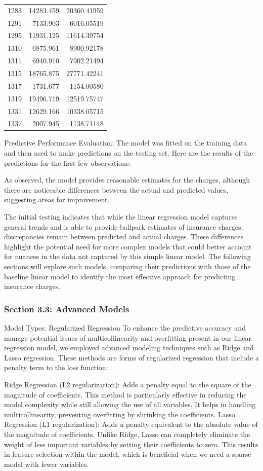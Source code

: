\documentclass[
  12pt,
]{article}
\begin{document}
\begin{longtable}[]{@{}lrr@{}}
1283 & 14283.459 & 20360.41959 \\
1291 & 7133.903 & 6016.05519 \\
1295 & 11931.125 & 11614.39754 \\
1310 & 6875.961 & 8900.92178 \\
1311 & 6940.910 & 7902.21494 \\
1315 & 18765.875 & 27771.42241 \\
1317 & 1731.677 & -1154.00580 \\
1319 & 19496.719 & 12519.75747 \\
1331 & 12629.166 & 10338.05715 \\
1337 & 2007.945 & 1138.71148 \\
\end{longtable}

Predictive Performance Evaluation: The model was fitted on the training
data and then used to make predictions on the testing set. Here are the
results of the predictions for the first few observations:

As observed, the model provides reasonable estimates for the charges,
although there are noticeable differences between the actual and
predicted values, suggesting areas for improvement.

The initial testing indicates that while the linear regression model
captures general trends and is able to provide ballpark estimates of
insurance charges, discrepancies remain between predicted and actual
charges. These differences highlight the potential need for more complex
models that could better account for nuances in the data not captured by
this simple linear model. The following sections will explore such
models, comparing their predictions with those of the baseline linear
model to identify the most effective approach for predicting insurance
charges.

\subsubsection{Section 3.3: Advanced
Models}\label{section-3.3-advanced-models}

Model Types: Regularized Regression To enhance the predictive accuracy
and manage potential issues of multicollinearity and overfitting present
in our linear regression model, we employed advanced modeling techniques
such as Ridge and Lasso regression. These methods are forms of
regularized regression that include a penalty term to the loss function:

Ridge Regression (L2 regularization): Adds a penalty equal to the square
of the magnitude of coefficients. This method is particularly effective
in reducing the model complexity while still allowing the use of all
variables. It helps in handling multicollinearity, preventing
overfitting by shrinking the coefficients. Lasso Regression (L1
regularization): Adds a penalty equivalent to the absolute value of the
magnitude of coefficients. Unlike Ridge, Lasso can completely eliminate
the weight of less important variables by setting their coefficients to
zero. This results in feature selection within the model, which is
beneficial when we need a sparse model with fewer variables.
\end{document}
